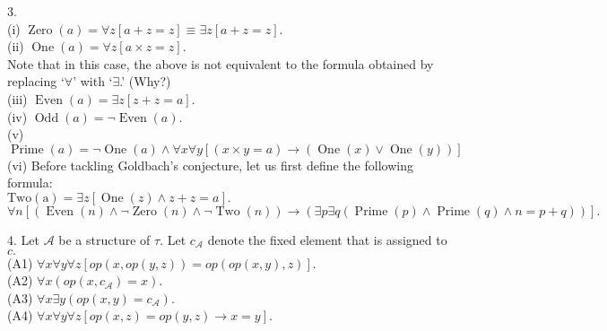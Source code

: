 \documentclass{article}
\begin{document}
\hrulefill

3.\\
(i) $\operatorname{Zero}(a) = \forall z[a + z = z] \equiv \exists z[a + z = z].$\\
(ii) $\operatorname{One}(a) = \forall z[a \times z = z].$\\
Note that in this case, the above is not equivalent to the formula obtained by replacing `$\forall$' with `$\exists$.' \hfill (Why?)\\
(iii) $\operatorname{Even}(a) = \exists z[z + z = a].$\\
(iv) $\operatorname{Odd}(a) = \neg \operatorname{Even}(a).$\\
(v) $\operatorname{Prime}(a) = \neg \operatorname{One}(a) \wedge \forall x\forall y[(x \times y = a) \to (\operatorname{One}(x) \vee \operatorname{One}(y))]$\\
(vi) Before tackling Goldbach's conjecture, let us first define the following formula:\\
$\operatorname{Two(a)} = \exists z[\operatorname{One}(z) \wedge z + z = a].$
\[\forall n[(\operatorname{Even}(n) \wedge \neg \operatorname{Zero}(n) \wedge \neg \operatorname{Two}(n)) \to (\exists p \exists q(\operatorname{Prime}(p) \wedge \operatorname{Prime}(q) \wedge n = p + q))].\]

\hrulefill

4. Let $\mathcal{A}$ be a structure of $\tau.$ Let $c_\mathcal{A}$ denote the fixed element that is assigned to $c.$\\
(A1) $\forall x\forall y\forall z[op(x, op(y, z)) = op(op(x, y), z)].$\\
(A2) $\forall x(op(x, c_\mathcal{A}) = x).$\\
(A3) $\forall x \exists y(op(x, y) = c_\mathcal{A}).$\\
(A4) $\forall x\forall y\forall z[op(x, z) = op(y, z) \to x = y].$\\

\hrulefill
\end{document}
